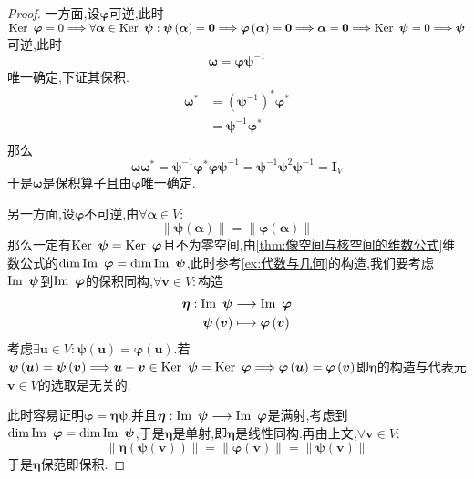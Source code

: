 {\begin{proof}
        一方面,设$\bm{\varphi}$可逆,此时$\operatorname{Ker\,} \,\bm{\varphi}=0\Longrightarrow\forall\bm{\alpha}\in\operatorname{Ker\,} \,\bm{\psi}:\bm{\psi}\left(\bm{\alpha}\right)=\bm{0}\Longrightarrow\bm{\varphi}\left(\bm{\alpha}\right)=\bm{0}\Longrightarrow\bm{\alpha}=\bm{0}\Longrightarrow\operatorname{Ker\,} \,\bm{\psi}=0\Longrightarrow\bm{\psi}$可逆,此时\[
            \bm{\omega}=\bm{\varphi\psi}^{-1}
        \]唯一确定,下证其保积.\begin{align*}
            \bm{\omega}^* & =\left(\bm{\psi}^{-1}\right)^*\bm{\varphi}^* \\
                          & =\bm{\psi}^{-1}\bm{\varphi}^*                \\
        \end{align*}那么\[
            \bm{\omega\omega}^*=\bm{\psi}^{-1}\bm{\varphi}^*\bm{\varphi}\bm{\psi}^{-1}=\bm{\psi}^{-1}\bm{\psi}^2\bm{\psi}^{-1}=\bm{I}_V
        \]于是$\bm{\omega}$是保积算子且由$\bm{\varphi}$唯一确定.

        另一方面,设$\bm{\varphi}$不可逆,由$\forall\bm{\alpha}\in V:$\[
            \left\lVert\bm{\psi}\left(
            \bm{\alpha}
            \right)\right\rVert=\left\lVert\bm{\varphi}\left(
            \bm{\alpha}
            \right)\right\rVert
        \]那么一定有$\operatorname{Ker\,} \,\bm{\psi}=\operatorname{Ker\,} \,\bm{\varphi}$且不为零空间,由\cref{thm:像空间与核空间的维数公式}维数公式的$\dim \operatorname{Im\,} \,\bm{\varphi}=\dim \operatorname{Im\,} \,\bm{\psi}$,此时参考\cref{ex:代数与几何}的构造,我们要考虑$\operatorname{Im\,} \,\bm{\psi}$到$\operatorname{Im\,} \,\bm{\varphi}$的保积同构,$\forall\bm{v}\in V:$构造\begin{align*}
            \bm{\eta}:\operatorname{Im\,} \,\bm{\psi} & \longrightarrow\operatorname{Im\,} \,\bm{\varphi}       \\
            \bm{\psi}\left(\bm{v}\right) & \longmapsto\bm{\varphi}\left(\bm{v}\right)
        \end{align*}考虑$\exists\bm{u}\in V:\bm{\psi}\left(\bm{u}\right)=\bm{\varphi}\left(\bm{u}\right)$.若$\bm{\psi}\left(\bm{u}\right)=\bm{\psi}\left(\bm{v}\right)\Longrightarrow\bm{u}-\bm{v}\in\operatorname{Ker\,} \,\bm{\psi}=\operatorname{Ker\,} \,\bm{\varphi}\Longrightarrow\bm{\varphi}\left(\bm{u}\right)=\bm{\varphi}\left(\bm{v}\right)$即$\bm{\eta}$的构造与代表元$\bm{v}\in V$的选取是无关的.

        此时容易证明$\bm{\varphi}=\bm{\eta\psi}$.并且$\bm{\eta}:\operatorname{Im\,} \,\bm{\psi}\longrightarrow\operatorname{Im\,} \,\bm{\varphi}$是满射,考虑到$\dim \operatorname{Im\,} \,\bm{\varphi}=\dim \operatorname{Im\,} \,\bm{\psi}$,于是$\bm{\eta}$是单射,即$\bm{\eta}$是线性同构.再由上文,$\forall\bm{v}\in V:$\[
            \left\lVert\bm{\eta}\left(
            \bm{\psi}\left(
                \bm{v}
                \right)
            \right)\right\rVert=\left\lVert\bm{\varphi}\left(
            \bm{v}
            \right)\right\rVert=\left\lVert\bm{\psi}\left(
            \bm{v}
            \right)\right\rVert
        \]于是$\bm{\eta}$保范即保积.


\end{proof}}
